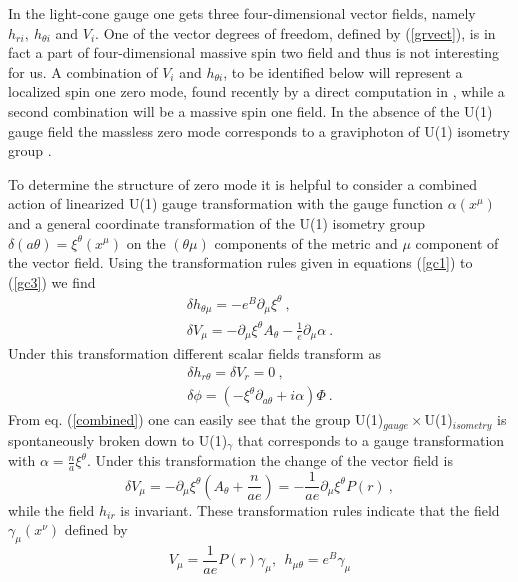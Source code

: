 \documentclass[a4paper,12pt]{article}
\begin{document}
In the light-cone gauge one gets three four-dimensional vector
fields, namely $h_{ri},~h_{\theta i}$ and $V_i$. One of the vector
degrees of freedom, defined by (\ref{grvect}), is in fact a part of
four-dimensional massive spin two field and thus is not interesting
for us. A combination of $V_i$ and $h_{\theta i}$, to be identified
below will represent a localized spin one zero mode, found recently
by a direct computation in
\cite{Giovannini:2002sb,Giovannini:2002mk}, while a second
combination will be a massive spin one field. In the absence of the
U(1) gauge field the massless zero mode corresponds to a graviphoton
of U(1) isometry group \cite{Neronov:2001br}.

To determine the structure of zero mode it is helpful
\cite{Randjbar-Daemi:1982hi} to consider a combined action of
linearized  U(1) gauge transformation with the gauge function
$\alpha(x^\mu)$ and a general coordinate transformation of the
U(1) isometry group $\delta (a\theta)=\xi^\theta(x^\mu)$ on the
$(\theta\mu)$ components of the metric and $\mu$ component of the
vector field. Using the transformation rules given in equations
(\ref{gc1}) to (\ref{gc3}) we find
\begin{eqnarray}
\delta h_{\theta\mu}=-e^B\partial_\mu \xi^\theta~,\\
\delta V_\mu =-\partial_\mu \xi^\theta A_\theta -
\frac{1}{e}\partial_\mu\alpha~.
\end{eqnarray}
Under this transformation different scalar fields transform as
\begin{eqnarray}
\delta h_{r\theta}=\delta V_r=0~,\\
\delta \phi=(-\xi^\theta\partial_{a\theta} + i\alpha)\Phi~.
\label{combined}
\end{eqnarray}
From eq. (\ref{combined}) one can easily see that the group
U(1)$_{gauge}\times$U(1)$_{isometry}$ is spontaneously broken down
to U(1)$_\gamma$ that corresponds to a gauge transformation with
$\alpha= \frac{n}{a}\xi^\theta$. Under this transformation the
change of the vector field is
\begin{equation}
\delta V_\mu =-\partial_\mu \xi^\theta (A_\theta +\frac{n}{a e})=
-\frac{1}{ae}\partial_\mu \xi^\theta P(r)~,
\end{equation}
while the field $h_{ir}$ is invariant.  These transformation rules
indicate that the field $\gamma_\mu(x^\nu)$ defined by
\begin{equation}
V_\mu= \frac{1}{ae}P(r)\gamma_\mu,~~
h_{\mu\theta}=  e^B \gamma_\mu
\end{equation}
\end{document}
